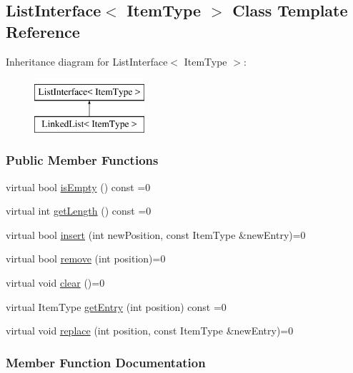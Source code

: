 \hypertarget{class_list_interface}{}\subsection{List\+Interface$<$ Item\+Type $>$ Class Template Reference}
\label{class_list_interface}
Inheritance diagram for List\+Interface$<$ Item\+Type $>$\+:\begin{figure}[H]
\begin{center}
\leavevmode
\includegraphics[height=2.000000cm]{class_list_interface}
\end{center}
\end{figure}
\subsubsection*{Public Member Functions}
\begin{DoxyCompactItemize}
\item 
virtual bool \hyperlink{class_list_interface_a924f91e7f81d7dcd3fda79bbcc671394}{is\+Empty} () const =0
\item 
virtual int \hyperlink{class_list_interface_afc85695d4137f1e29ff02e179c9f3221}{get\+Length} () const =0
\item 
virtual bool \hyperlink{class_list_interface_a5b2f86954a86172699a3495982c38e77}{insert} (int new\+Position, const Item\+Type \&new\+Entry)=0
\item 
virtual bool \hyperlink{class_list_interface_a5543002ec0d64bd2a63f3732f437af65}{remove} (int position)=0
\item 
virtual void \hyperlink{class_list_interface_adfda414908b645bdf19bcab8269168b7}{clear} ()=0
\item 
virtual Item\+Type \hyperlink{class_list_interface_a86987f69e5056d287212ede41db1956a}{get\+Entry} (int position) const =0
\item 
virtual void \hyperlink{class_list_interface_aae877a56b7b9f5f526c37a00e234fad1}{replace} (int position, const Item\+Type \&new\+Entry)=0
\end{DoxyCompactItemize}


\subsubsection{Member Function Documentation}
\hypertarget{class_list_interface_adfda414908b645bdf19bcab8269168b7}{}\label{class_list_interface_adfda414908b645bdf19bcab8269168b7} 
